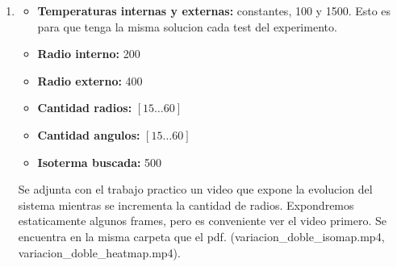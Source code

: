 \begin{enumerate}
	\item \begin{itemize}
						\item \textbf{Temperaturas internas y externas:} constantes, 100 y 1500. Esto es para que tenga la misma solucion cada test del experimento.
						\item \textbf{Radio interno:} 200
						\item \textbf{Radio externo:} 400
						\item \textbf{Cantidad radios:} $[15\dots60]$
						\item \textbf{Cantidad angulos:} $[15\dots60]$
						\item \textbf{Isoterma buscada:} 500
					\end{itemize}
	Se adjunta con el trabajo practico un video que expone la evolucion del sistema mientras se incrementa la cantidad de radios. Expondremos estaticamente algunos frames, pero es conveniente ver el video primero. Se encuentra en la misma carpeta que el pdf. (variacion\_doble\_isomap.mp4, variacion\_doble\_heatmap.mp4).


\end{enumerate}
